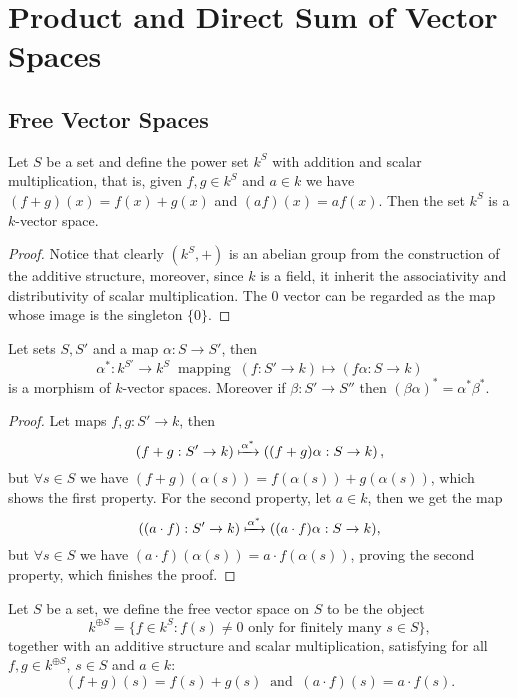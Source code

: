 \section{Product and Direct Sum of Vector Spaces}

\subsection{Free Vector Spaces}

\begin{proposition}
   Let \(S\) be a set and define the power set \(k^S\) with addition and
   scalar multiplication, that is, given \(f, g \in k^S\) and \(a \in k\) we
   have \((f + g)(x) = f(x) + g(x)\) and \((a f)(x) = af(x)\). Then the set
   \(k^S\) is a \(k\)-vector space.
\end{proposition}

\begin{proof}
   Notice that clearly \((k^S, +)\) is an abelian group from the construction of
   the additive structure, moreover, since \(k\) is a field, it inherit the
   associativity and distributivity of scalar multiplication. The \(0\) vector
   can be regarded as the map whose image is the singleton \(\{0\}\).
\end{proof}

\begin{proposition}[Functoriality of \(k^S\)]
   Let sets \(S, S'\) and a map \(\alpha : S \to S'\), then
   \[
      \alpha^\ast : k^{S'} \to k^S \ \text{ mapping }\ (f : S' \to k) \mapsto
      (f  \alpha : S \to k)
   \]
   is a morphism of \(k\)-vector spaces. Moreover if \(\beta : S' \to S''\) then
   \((\beta  \alpha)^\ast = \alpha^\ast  \beta^\ast\).
\end{proposition}

\begin{proof}
   Let maps \(f, g : S' \to k\), then
   \[
      (f + g : S' \to k) \xmapsto{\alpha^\ast} \left( (f + g) \alpha : S
      \to k \right),
   \]
   but \(\forall s \in S\) we have \((f + g)(\alpha(s)) = f(\alpha(s)) +
   g(\alpha(s))\), which shows the first property. For the second property, let
   \(a \in k\), then we get the map
   \[
      ((a \cdot f) : S' \to k) \xmapsto{\alpha^\ast} ( (a \cdot f)  \alpha
      : S \to k),
   \]
   but \(\forall s \in S\) we have \((a \cdot f)(\alpha(s)) = a \cdot
   f(\alpha(s))\), proving the second property, which finishes the proof.
\end{proof}

\begin{definition}\label{def: free vector space}
   Let \(S\) be a set, we define the free vector space on \(S\) to be the object
   \[
      k^{\oplus S} = \{f \in k^S : f(s) \neq 0 \text{ only for finitely many }
      s \in S\},
   \]
   together with an additive structure and scalar multiplication, satisfying for
   all \(f, g \in k^{\oplus S}\), \(s \in S\) and \(a \in k\):
   \[
      (f + g)(s) = f(s) + g(s)\ \text{ and }\ (a \cdot f)(s) = a \cdot f(s).
   \]
\end{definition}


